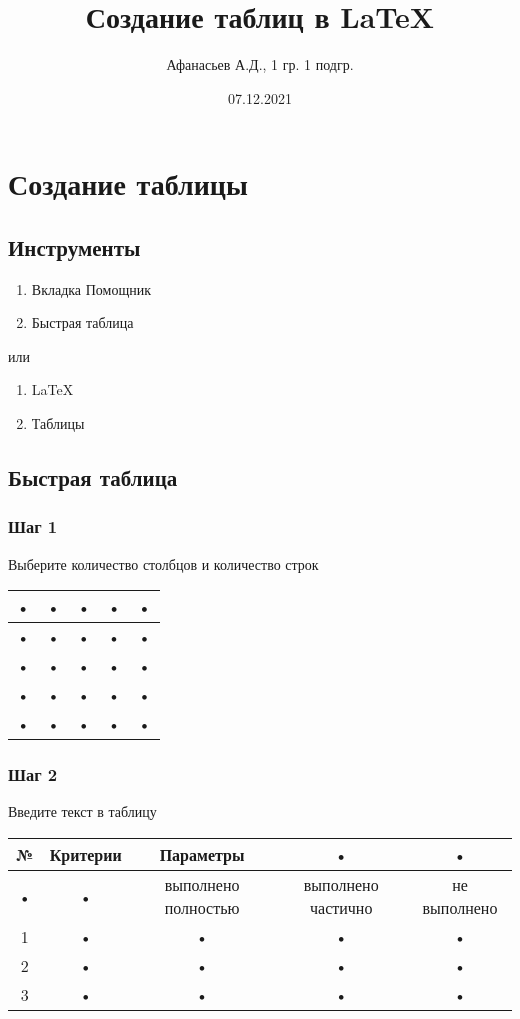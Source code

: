 \documentclass[a4paper,12pt]{article} %
\author{Афанасьев А.Д., 1 гр. 1 подгр.}
\title{Создание таблиц в \LaTeX}
\date{07.12.2021}
\begin{document}
\maketitle
\newpage
\section{Создание таблицы}
\subsection{Инструменты}
\begin{enumerate}
\item Вкладка Помощник
\item Быстрая таблица
\end{enumerate}

или

\begin{enumerate}
\item LaTeX
\item Таблицы
\end{enumerate}

\subsection{Быстрая таблица}
\subsubsection{Шаг 1}
Выберите количество столбцов и количество строк\\
\begin{tabular}{|c|c|c|c|c|}
\hline
• & • & • & • & • \\
\hline
• & • & • & • & • \\
\hline
• & • & • & • & • \\
\hline
• & • & • & • & • \\
\hline
• & • & • & • & • \\
\hline
\end{tabular}

\subsubsection{Шаг 2}
Введите текст в таблицу\\
\begin{tabular}{|c|c|c|c|c|}
\hline
№ & Критерии & Параметры & • & • \\
\hline
• & • & выполнено полностью & выполнено частично & не выполнено \\
\hline
1 & • & • & • & • \\
\hline
2 & • & • & • & • \\
\hline
3 & • & • & • & • \\
\hline
\end{tabular}
\end{document}
